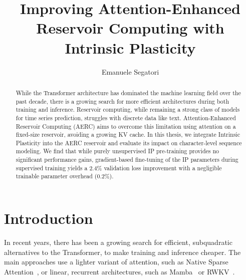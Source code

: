 \documentclass{sapthesis}
\title{Improving Attention-Enhanced Reservoir Computing with Intrinsic Plasticity}
\author{Emanuele Segatori}
\begin{document}
\frontmatter
\maketitle

\dedication{Dedicated to\\ my family and friends.}

\begin{abstract}
  While the Transformer architecture has dominated the machine learning field
  over the past decade, there is a growing search for more efficient architectures
  during both training and inference. Reservoir computing, while remaining a
  strong class of models for time series prediction, struggles with discrete data
  like text. Attention-Enhanced Reservoir Computing (AERC) aims to overcome
  this limitation using attention on a fixed-size reservoir, avoiding a
  growing KV cache. In this thesis, we integrate Intrinsic Plasticity into the
  AERC reservoir and evaluate its impact on character-level sequence modeling.
  We find that while purely unsupervised IP pre-training provides no significant
  performance gains, gradient-based fine-tuning of the IP parameters during
  supervised training yields a $2.4\%$ validation loss improvement with a
  negligible trainable parameter overhead ($0.2\%$).
\end{abstract}

\tableofcontents


\mainmatter

\chapter{Introduction}
In recent years, there has been a growing search for efficient, subquadratic alternatives to the Transformer, to make training and inference cheaper. The main approaches use a lighter variant of attention, such as Native Sparse Attention~\cite{yuan-etal-2025-native}, or linear, recurrent architectures, such as Mamba~\cite{gu2024mambalineartimesequencemodeling} or RWKV~\cite{peng2023rwkvreinventingrnnstransformer}.
\end{document}
